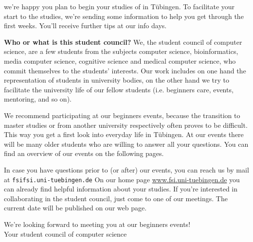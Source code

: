 we're happy you plan to begin your studies of \studiengang in Tübingen.
To facilitate your start to the studies, we're sending some information to help you get through the first weeks.
You'll receive further tips at our info days.

\textbf{Who or what is this \glqq student council\grqq?} We, the student council of computer science, are a few students from the subjects computer science, bioinformatics, media computer science, cognitive science and medical computer science, who commit themselves to the students' interests. Our work includes on one hand the representation of students in university bodies, on the other hand we try to facilitate the university life of our fellow students (i.e. beginners care,
events, mentoring, and so on).

\ifmaster
    \ifml
We recommend participating at our beginners events, because the transition to master studies or from another university respectively often proves to be difficult. This way you get a first look into everyday life in Tübingen.
    \fi
\fi 
At our events there will be many older students who are willing to answer all your questions. You can find an overview of our events on the following pages.

In case you have questions prior to (or after) our events, you can reach us by mail at \texttt{fsi\At fsi.uni-tuebingen.de}
On our home page
\url{www.fsi.uni-tuebingen.de} you can already find helpful information about your studies. If you're interested in collaborating in the student council, just come to one of our meetings. The current date will be published on our web page.

We're looking forward to meeting you at our beginners events!\\
Your student council of computer science
\vfill
